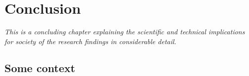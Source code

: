 %
%
%




\chapter[Conclusion]{Conclusion}\label{app:chapterx}

\emph{This is a concluding chapter explaining the scientific and technical
implications for society of the research findings in considerable detail.}\\[3cm]


\lipsum[42]

\section{Some context}
\lipsum[2-4]

